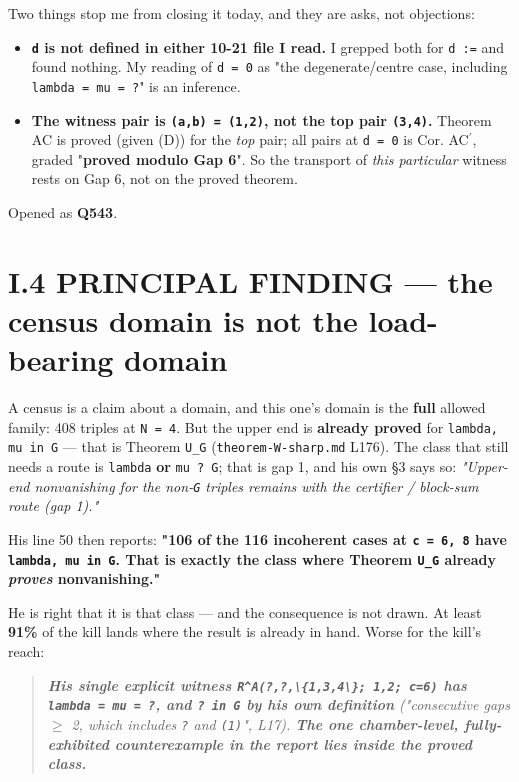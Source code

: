 \documentclass[11pt,a4paper]{article}
\begin{document}
Two things stop me from closing it today, and they are asks, not objections:

\begin{itemize}
\item \textbf{\mbox{\texttt{d}} is not defined in either 10-21 file I read.} I grepped both for \mbox{\texttt{d :=}} and found nothing. My reading of \mbox{\texttt{d = 0}} as "the degenerate/centre case, including \mbox{\texttt{lambda = mu = ?}}" is an inference.
\item \textbf{The witness pair is \mbox{\texttt{(a,b) = (1,2)}}, not the top pair \mbox{\texttt{(3,4)}}.} Theorem AC is proved (given (D)) for the \emph{top} pair; all pairs at \mbox{\texttt{d = 0}} is Cor. AC$^{\prime}$, graded "\textbf{proved modulo Gap 6}". So the transport of \emph{this particular} witness rests on Gap 6, not on the proved theorem.
\end{itemize}

Opened as \textbf{Q543}.

\section*{I.4 PRINCIPAL FINDING --- the census domain is not the load-bearing domain}

A census is a claim about a domain, and this one's domain is the \textbf{full} allowed family: 408 triples at \mbox{\texttt{N = 4}}. But the upper end is \textbf{already proved} for \mbox{\texttt{lambda, mu in G}} --- that is Theorem \mbox{\texttt{U\_G}} (\mbox{\texttt{theorem-W-sharp.md}} L176). The class that still needs a route is \mbox{\texttt{lambda}} \textbf{or} \mbox{\texttt{mu ? G}}; that is gap 1, and his own \S{}3 says so: \emph{"Upper-end nonvanishing for the non-\mbox{\texttt{G}} triples remains with the certifier / block-sum route (gap 1)."}

His line 50 then reports: \textbf{"106 of the 116 incoherent cases at \mbox{\texttt{c = 6, 8}} have \mbox{\texttt{lambda, mu in G}}. That is exactly the class where Theorem \mbox{\texttt{U\_G}} already \emph{proves} nonvanishing."}

He is right that it is that class --- and the consequence is not drawn. At least \textbf{91\%} of the kill lands where the result is already in hand. Worse for the kill's reach:

\begin{quote}\itshape \textbf{His single explicit witness \mbox{\texttt{R\textasciicircum{}A(?,?,\textbackslash{}\{1,3,4\textbackslash{}\}; 1,2; c=6)}} has \mbox{\texttt{lambda = mu = ?}}, and \mbox{\texttt{? in G}} by his own definition} (\emph{"consecutive gaps $\geq$ 2, which includes \mbox{\texttt{?}} and \mbox{\texttt{(1)}}"}, L17). \textbf{The one chamber-level, fully-exhibited counterexample in the report lies inside the proved class.}\end{quote}
\end{document}
